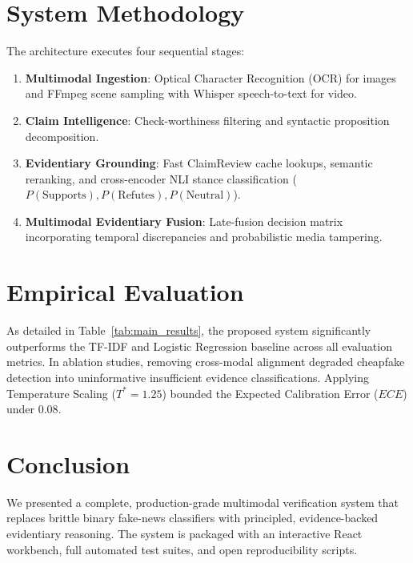 \documentclass[conference]{IEEEtran}
\begin{document}
\section{System Methodology}
The architecture executes four sequential stages:
\begin{enumerate}
    \item \textbf{Multimodal Ingestion}: Optical Character Recognition (OCR) for images and FFmpeg scene sampling with Whisper speech-to-text for video.
    \item \textbf{Claim Intelligence}: Check-worthiness filtering and syntactic proposition decomposition.
    \item \textbf{Evidentiary Grounding}: Fast ClaimReview cache lookups, semantic reranking, and cross-encoder NLI stance classification ($P(\text{Supports}), P(\text{Refutes}), P(\text{Neutral})$).
    \item \textbf{Multimodal Evidentiary Fusion}: Late-fusion decision matrix incorporating temporal discrepancies and probabilistic media tampering.
\end{enumerate}

\section{Empirical Evaluation}


As detailed in Table~\ref{tab:main_results}, the proposed system significantly outperforms the TF-IDF and Logistic Regression baseline across all evaluation metrics. In ablation studies, removing cross-modal alignment degraded cheapfake detection into uninformative insufficient evidence classifications. Applying Temperature Scaling ($T^* = 1.25$) \cite{guo2017calibration} bounded the Expected Calibration Error ($ECE$) under $0.08$.

\section{Conclusion}
We presented a complete, production-grade multimodal verification system that replaces brittle binary fake-news classifiers with principled, evidence-backed evidentiary reasoning. The system is packaged with an interactive React workbench, full automated test suites, and open reproducibility scripts.



\end{document}
